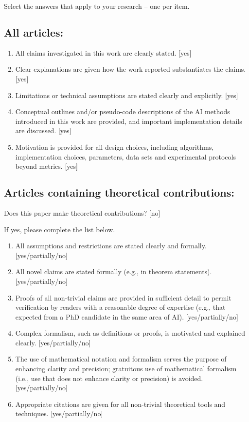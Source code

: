 \documentclass[]{jair}
\begin{document}
Select the answers that apply to your research -- one per item. 

\subsection*{All articles:}

\begin{enumerate}
    \item All claims investigated in this work are clearly stated. 
    [yes]
    \item Clear explanations are given how the work reported substantiates the claims. 
    [yes]
    \item Limitations or technical assumptions are stated clearly and explicitly. 
    [yes]
    \item Conceptual outlines and/or pseudo-code descriptions of the AI methods introduced in this work are provided, and important implementation details are discussed. 
    [yes]
    \item 
    Motivation is provided for all design choices, including algorithms, implementation choices, parameters, data sets and experimental protocols beyond metrics.
    [yes]
\end{enumerate}

\subsection*{Articles containing theoretical contributions:}
Does this paper make theoretical contributions? 
[no] 

If yes, please complete the list below.

\begin{enumerate}
    \item All assumptions and restrictions are stated clearly and formally. 
    [yes/partially/no]
    \item All novel claims are stated formally (e.g., in theorem statements). 
    [yes/partially/no]
    \item Proofs of all non-trivial claims are provided in sufficient detail to permit verification by readers with a reasonable degree of expertise (e.g., that expected from a PhD candidate in the same area of AI). [yes/partially/no]
    \item
    Complex formalism, such as definitions or proofs, is motivated and explained clearly.
    [yes/partially/no]
    \item 
    The use of mathematical notation and formalism serves the purpose of enhancing clarity and precision; gratuitous use of mathematical formalism (i.e., use that does not enhance clarity or precision) is avoided.
    [yes/partially/no]
    \item 
    Appropriate citations are given for all non-trivial theoretical tools and techniques. 
    [yes/partially/no]
\end{enumerate}
\end{document}
